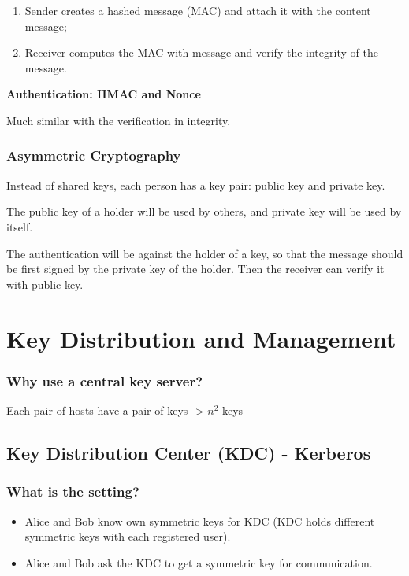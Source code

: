 \begin{enumerate}
    \item Sender creates a hashed message (MAC) and attach it with the content message;
    \item Receiver computes the MAC with message and verify the integrity of the message.
\end{enumerate}

\textbf{Authentication: HMAC and Nonce}

Much similar with the verification in integrity.


\subsubsection{Asymmetric Cryptography}
Instead of shared keys, each person has a key pair: public key and private key.

The public key of a holder will be used by others, and private key will be used by itself.

The authentication will be against the holder of a key, so that the message should be first signed by the private key of the holder. Then the receiver can verify it with public key.

\section{Key Distribution and Management}
\subsubsection{Why use a central key server?}
Each pair of hosts have a pair of keys -> $n^2$ keys

\subsection{Key Distribution Center (KDC) - Kerberos}
\subsubsection{What is the setting?}
\begin{itemize}
    \item Alice and Bob know own symmetric keys for KDC (KDC holds different symmetric keys with each registered user).
    \item Alice and Bob ask the KDC to get a symmetric key for communication.
\end{itemize}

